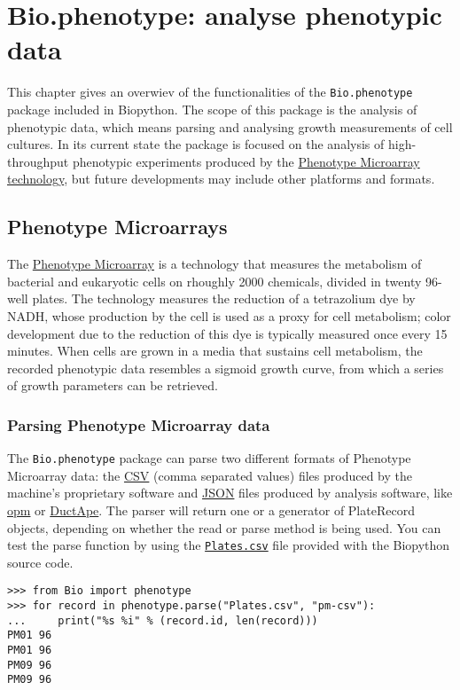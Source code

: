 \chapter{Bio.phenotype: analyse phenotypic data}
\label{chapter:phenotype}

This chapter gives an overwiev of the functionalities of the
\verb|Bio.phenotype| package included in Biopython. The scope of this
package is the analysis of phenotypic data, which means parsing and 
analysing growth measurements of cell cultures.
In its current state the package is focused on the analysis of
high-throughput phenotypic experiments produced by the 
\href{https://en.wikipedia.org/wiki/Phenotype_microarray}{Phenotype Microarray technology}, 
but future developments may include other platforms and formats.

\section{Phenotype Microarrays}
\label{sec:phenotypemicroarrays}

The \href{https://en.wikipedia.org/wiki/Phenotype_microarray}{Phenotype Microarray}
is a technology that measures the metabolism of bacterial
and eukaryotic cells on rhoughly 2000 chemicals, divided in twenty 96-well
plates.
The technology measures the reduction of a tetrazolium dye by
NADH, whose production by the cell is used as a proxy for cell metabolism;
color development due to the reduction of this dye is typically measured
once every 15 minutes.
When cells are grown in a media that sustains cell metabolism, the
recorded phenotypic data resembles a sigmoid growth curve, from which a
series of growth parameters can be retrieved.

\subsection{Parsing Phenotype Microarray data}

The \verb|Bio.phenotype| package can parse two different formats of
Phenotype Microarray data: the
\href{https://en.wikipedia.org/wiki/Comma-separated_values}{CSV}
(comma separated values) files produced by the machine's proprietary
software and \href{https://en.wikipedia.org/wiki/JSON}{JSON}
files produced by analysis software, like
\href{https://www.dsmz.de/research/microorganisms/projects/analysis-of-omnilog-phenotype-microarray-data.html}{opm}
or \href{http://combogenomics.github.io/DuctApe/}{DuctApe}.
The parser will return one or a generator of PlateRecord objects, depending
on whether the read or parse method is being used.
You can test the parse function by using the \href{http://biopython.org/SRC/biopython/Doc/examples/Plates.csv}{\texttt{Plates.csv}} file provided with the Biopython source code.
\begin{verbatim}
>>> from Bio import phenotype
>>> for record in phenotype.parse("Plates.csv", "pm-csv"):
...     print("%s %i" % (record.id, len(record)))
PM01 96
PM01 96
PM09 96
PM09 96
\end{verbatim}

